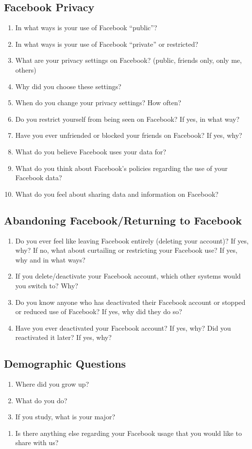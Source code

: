 \subsection{Facebook Privacy}
\begin{enumerate}
\item In what ways is your use of Facebook “public”?
\item In what ways is your use of Facebook “private” or restricted?
\item What are your privacy settings on Facebook? (public, friends only, only me, others)
\item Why did you choose these settings?
\item When do you change your privacy settings? How often?
\item Do you restrict yourself from being seen on Facebook? If yes, in what way?
\item Have you ever unfriended or blocked your friends on Facebook? If yes, why?
\item What do you believe Facebook uses your data for?
\item What do you think about Facebook’s policies regarding the use of your Facebook data?
\item What do you feel about sharing data and information on Facebook?
\end{enumerate}
\subsection{Abandoning Facebook/Returning to Facebook}
\begin{enumerate}
\item Do you ever feel like leaving Facebook entirely (deleting your account)? If yes, why? If no, what about curtailing or restricting your Facebook use? If yes, why and in what ways?
\item If you delete/deactivate your Facebook account, which other systems would you switch to? Why?
\item Do you know anyone who has deactivated their Facebook account or stopped or reduced use of Facebook? If yes, why did they do so?
\item Have you ever deactivated your Facebook account? If yes, why? Did you reactivated it later? If yes, why?
\end{enumerate}
\subsection{Demographic Questions}
\begin{enumerate}
\item Where did you grow up?
\item What do you do?
\item If you study, what is your major?
\end{enumerate}
\begin{enumerate}
\item Is there anything else regarding your Facebook usage that you would like to share with us?
\end{enumerate}

